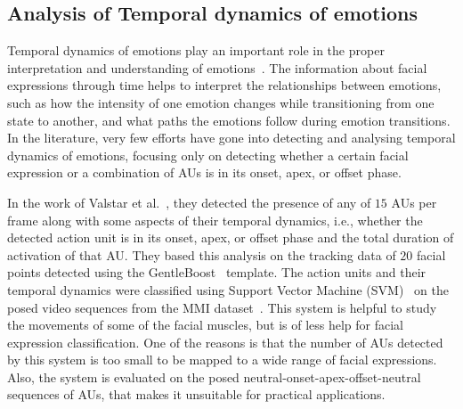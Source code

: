 \documentclass[10pt,journal,cspaper,compsoc]{IEEEtran}
\begin{document}

\subsection{Analysis of Temporal dynamics of emotions}
\label{sec_literature_analysis}
Temporal dynamics of emotions play an important role in the proper interpretation and understanding of emotions~\cite{schmidt2001human}. The information about facial expressions through time helps to interpret the relationships between emotions, such as how the intensity of one emotion changes while transitioning from one state to another, and what paths the emotions follow during emotion transitions. In the literature, very few efforts have gone into detecting and analysing temporal dynamics of emotions, focusing only on detecting whether a certain facial expression or a combination of AUs is in its onset, apex, or offset phase.

In the work of Valstar et al.~\cite{valstar2006fully}, they detected the presence of any of $15$ AUs per frame along with some aspects of their temporal dynamics, i.e., whether the detected action unit is in its onset, apex, or offset phase and the total duration of activation of that AU. They based this analysis on the tracking data of $20$ facial points detected using the GentleBoost~\cite{friedman2000additive} template. The action units and their temporal dynamics were classified using Support Vector Machine (SVM)~\cite{Michel03} on the posed video sequences from the MMI dataset~\cite{Pantic05}. This system is helpful to study the movements of some of the facial muscles, but is of less help for facial expression classification. One of the reasons is that the number of AUs detected by this system is too small to be mapped to a wide range of facial expressions. Also, the system is evaluated on the posed neutral-onset-apex-offset-neutral sequences of AUs, that makes it unsuitable for practical applications.
\end{document}
